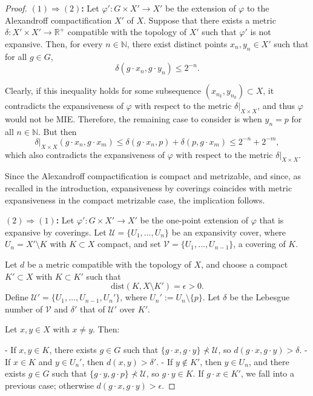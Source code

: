 \documentclass[12pt]{amsart}
\theoremstyle{plain}
\theoremstyle{definition}
\theoremstyle{remark}
\begin{document}
\begin{proof}
\textbf{\( (1) \Rightarrow (2) \):}  
Let \( \varphi' : G \times X' \to X' \) be the extension of \( \varphi \) to the Alexandroff compactification \( X' \) of \( X \). Suppose that there exists a metric \( \delta : X' \times X' \to \mathbb{R}^+ \) compatible with the topology of \( X' \) such that \( \varphi' \) is not expansive. Then, for every \( n \in \mathbb{N} \), there exist distinct points \( x_n, y_n \in X' \) such that for all \( g \in G \),
\[
\delta(g \cdot x_n, g \cdot y_n) \leq 2^{-n}.
\]

Clearly, if this inequality holds for some subsequence \( (x_{n_k}, y_{n_k}) \subset X \), it contradicts the expansiveness of \( \varphi \) with respect to the metric \( \delta|_{X \times X} \), and thus \( \varphi \) would not be MIE. Therefore, the remaining case to consider is when \( y_n = p \) for all \( n \in \mathbb{N} \). But then
\[
\delta|_{X \times X}(g \cdot x_n, g \cdot x_m) \leq \delta(g \cdot x_n, p) + \delta(p, g \cdot x_m) \leq 2^{-n} + 2^{-m},
\]
which also contradicts the expansiveness of \( \varphi \) with respect to the metric \( \delta|_{X \times X} \). 

Since the Alexandroff compactification is compact and metrizable, and since, as recalled in the introduction, expansiveness by coverings coincides with metric expansiveness in the compact metrizable case, the implication follows.


\vspace{0.5em}
\textbf{\( (2) \Rightarrow (1) \):}  
Let \( \varphi' : G \times X' \to X' \) be the one-point extension of \( \varphi \) that is expansive by coverings. Let \( \mathcal{U} = \{ U_1, \ldots, U_n \} \) be an expansivity cover, where \( U_n = X' \setminus K \) with \( K \subset X \) compact, and set \( \mathcal{V} = \{ U_1, \ldots, U_{n-1} \} \), a covering of \( K \).

Let \( d \) be a metric compatible with the topology of \( X \), and choose a compact \( K' \subset X \) with \( K \subset K' \) such that
\[
\text{dist}(K, X \setminus K') = \epsilon > 0.
\]
Define \( \mathcal{U}' = \{ U_1, \ldots, U_{n-1}, U_n' \} \), where \( U_n' := U_n \setminus \{ p \} \). Let \( \delta \) be the Lebesgue number of \( \mathcal{V} \) and \( \delta' \) that of \( \mathcal{U}' \) over \( K' \).

Let \( x, y \in X \) with \( x \ne y \). Then:

- If \( x, y \in K \), there exists \( g \in G \) such that \( \{ g \cdot x, g \cdot y \} \nprec \mathcal{U} \), so \( d(g \cdot x, g \cdot y) > \delta \).
- If \( x \in K \) and \( y \in U_n' \), then \( d(x,y) > \delta' \).
- If \( y \notin K' \), then \( y \in U_n \), and there exists \( g \in G \) such that \( \{ g \cdot y, g \cdot p \} \nprec \mathcal{U} \), so \( g \cdot y \in K \). If \( g \cdot x \in K' \), we fall into a previous case; otherwise \( d(g \cdot x, g \cdot y) > \epsilon \).


\end{proof}
\end{document}
